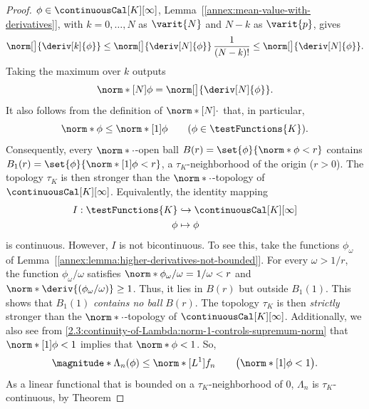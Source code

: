 \begin{proof}
$\phi \in \continuousCal[K][\infty]$, Lemma~[\ref{annex:mean-value-with-derivatives}], with $k = 0, \dots, N$ as $\varit{N}$ %
and $N - k$ as $\varit{p}$, gives
% 
\begin{equation}\label{2.3:continuity-of-Lambda:mean-value-with-derivatives}
  \norm[\big]{\deriv[k]{\phi}} \leq \norm[\big]{\deriv[N]{\phi}} \, \frac{1}{(N-k)!} \leq \norm[\big]{\deriv[N]{\phi}}.
\end{equation}
% 
Taking the maximum over $k$ outputs
% 
\begin{equation}\label{2.3:continuity-of-Lambda:norm-N-is-deriv-N}
  \norm*[N]{\phi} = \norm[\big]{\deriv[N]{\phi}}.
\end{equation}
% 
\skipline
It also follows from the definition of $\norm*[N]{\cdot}$ that, in particular, 
%
\begin{equation}\label{2.3:continuity-of-Lambda:norm-1-controls-supremum-norm}
  \norm*{\phi} \leq \norm*[1]{\phi} \qquad(\phi \in \testFunctions{K}).
\end{equation}
% 
Consequently, every $\norm*{\cdot}$-open ball $B(r) = \set{\phi}{\norm*{\phi}< r}$ contains %
$B_1(r) = \set{\phi}{\norm*[1]{\phi}< r}$, a $\tau_K$-neighborhood of the origin ($r>0$). %
The topology $\tau_K$ is then stronger than the $\norm*{\cdot}$-topology of $\continuousCal[K][\infty]$. Equivalently, the %
identity mapping
% 
\begin{align}
  I: \testFunctions{K} &\hookrightarrow \continuousCal[K][\infty] \\
  \phi &\mapsto \phi \nonumber
\end{align}
%
is continuous. However, $I$ is not bicontinuous. To see this, take the functions $\phi_\omega$ of %
Lemma~[\ref{annex:lemma:higher-derivatives-not-bounded}]. For every $\omega > 1/r$, the function $\phi_\omega/\omega$ %
satisfies $\norm*{\phi_\omega/\omega} = 1/\omega < r$ and $\norm*{\deriv{(\phi_\omega/\omega)}} \geq 1$. Thus, it lies in %
$B(r)$ but outside $B_1(1)$. This shows that $B_1(1)$ \emph{contains no ball} %
$B(r)$. The topology $\tau_K$ is then \emph{strictly} stronger than the $\norm*{\cdot}$-topology of %
$\continuousCal[K][\infty]$. Additionally, we also see from \eqref{2.3:continuity-of-Lambda:norm-1-controls-supremum-norm} %
that $\norm*[1]{\phi} < 1$ implies that $\norm*{\phi} < 1$. So,
% 
\begin{equation}
  \magnitude*{\Lambda_n(\phi)} \leq \norm*[L^1]{f_n} \qquad\bigl(\norm*[1]{\phi} < 1\bigr).
\end{equation}
% 
As a linear functional that is bounded on a $\tau_K$-neighborhood of $0$, $\Lambda_n$ is $\tau_K$-continuous, by Theorem %

\end{proof}
